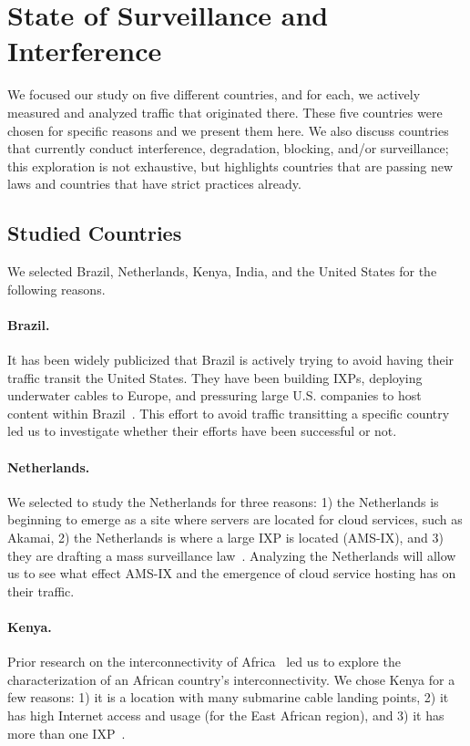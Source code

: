 \section{State of Surveillance and Interference}
\label{surv}
We focused our study on five different countries, and for each, we actively measured and analyzed traffic that originated there.  These five countries were chosen for specific reasons and we present them here.  We also discuss countries that currently conduct interference, degradation, blocking, and/or surveillance; this exploration is not exhaustive, but highlights countries that are passing new laws and countries that have strict practices already.   

\subsection{Studied Countries}
We selected Brazil, Netherlands, Kenya, India, and the United States for the following reasons.

\paragraph{Brazil.} It has been widely publicized that Brazil is actively trying to avoid having their traffic transit the United States.  They have been building IXPs, deploying underwater cables to Europe, and pressuring large U.S. companies to host content within Brazil~\cite{brazil_history, brazil_break_from_US, brazil_conference,
  brazil_conference2, brazil_human_rights, brazil_cable, brazil_us_companies, brazil_IXP1}.  This effort to avoid traffic transitting a specific country led us to investigate whether their efforts have been successful or not.

\paragraph{Netherlands.}  We selected to study the Netherlands for three reasons: 1) the Netherlands is beginning to emerge as a site where servers are located for cloud services, such as Akamai, 2) the Netherlands is where a large IXP is located (AMS-IX), and 3) they are drafting a mass surveillance law~\cite{netherlands_surveillance}. Analyzing the Netherlands will allow us to see what effect AMS-IX and the emergence of cloud service hosting has on their traffic.

\paragraph{Kenya.} Prior research on the interconnectivity of Africa~\cite{gupta2014peering, fanou2015diversity} led us to explore the characterization of an African country's interconnectivity.  We chose Kenya for a few reasons: 1) it is a location with many submarine cable landing points, 2) it has high Internet access and usage (for the East African region), and 3) it has more than one IXP~\cite{kenya_nigeria, teams}.

